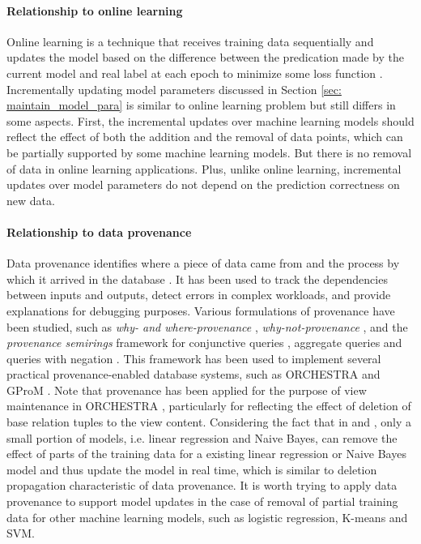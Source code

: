 \paragraph{Relationship to online learning} Online learning is a technique that receives training data sequentially and updates the model based on the difference between the predication made by the current model and real label at each epoch to minimize some loss function \cite{DBLP:journals/corr/abs-1802-02871}. Incrementally updating model parameters discussed in Section \ref{sec: maintain_model_para} is similar to online learning problem but still differs in some aspects. First, the incremental updates over machine learning models should reflect the effect of both the addition and the removal of data points, which can be partially supported by some machine learning models. But there is no removal of data in online learning applications. Plus, unlike online learning, incremental updates over model parameters do not depend on the prediction correctness on new data. 

\paragraph{Relationship to data provenance} Data provenance identifies where a piece of data came from and the process by which it arrived in the database \cite{buneman2001and}.  It has been used to track the dependencies between inputs and outputs, detect errors in complex workloads, and provide explanations for debugging purposes. Various formulations of provenance have been studied, such as \textit{why- and where-provenance} \cite{buneman2001and}, \textit{why-not-provenance} \cite{chapman2009not}, and the \textit{provenance semirings} framework %
for conjunctive queries \cite{green2007provenance}, aggregate queries \cite{amsterdamer2011provenance} and queries with negation \cite{xu2018provenance}.  This framework has been used to implement several practical provenance-enabled database systems, such as ORCHESTRA \cite{ives2008orchestra} and GProM \cite{arab2018gprom}. Note that provenance has been applied for the purpose of view maintenance in ORCHESTRA \cite{ives2008orchestra}, particularly for reflecting the effect of deletion of base relation tuples to the view content. Considering the fact that in \cite{deshpande2006mauvedb} and \cite{gupta2015processing}, only a small portion of models, i.e. linear regression and Naive Bayes, can remove the effect of parts of the training data for a existing linear regression or Naive Bayes model and thus update the model in real time, which is similar to deletion propagation characteristic of data provenance. It is worth trying to apply data provenance to support model updates in the case of removal of partial training data for other machine learning models, such as logistic regression, K-means and SVM.



